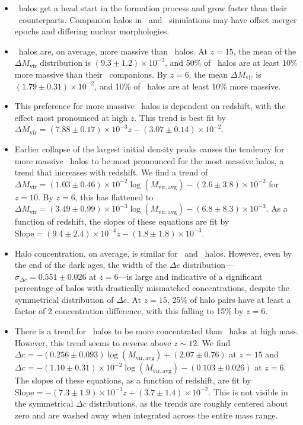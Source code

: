 \begin{itemize}

	\item  \lpt\ halos get a head start in the formation process and grow faster than their \za\ counterparts.  Companion halos in \lpt\ and \za\ simulations may have offset merger epochs and differing nuclear morphologies.

	\item  \lpt\ halos are, on average, more massive than \za\ halos.  At $z = 15$, the mean of the $\Delta M_{\mathrm{vir}}$ distribution is $(9.3 \pm 1.2) \times 10^{-2}$, and 50\% of \lpt\ halos are at least 10\% more massive than their \za\ companions.  By $z = 6$, the mean $\Delta M_{\mathrm{vir}}$ is $(1.79 \pm 0.31) \times 10^{-2}$, and 10\% of \lpt\ halos are at least 10\% more massive.

	\item  This preference for more massive \lpt\ halos is dependent on redshift, with the effect most pronounced at high $z$.  This trend is best fit by $\Delta M_{\mathrm{vir}} = (7.88 \pm 0.17) \times 10^{-3} z - (3.07 \pm 0.14) \times 10^{-2}$.
		
	\item  Earlier collapse of the largest initial density peaks causes the tendency for more massive \lpt\ halos to be most pronounced for the most massive halos, a trend that increases with redshift. We find a trend of $\Delta M_{\mathrm{vir}} = (1.03 \pm 0.46) \times 10^{-2} \log(M_{\mathrm{vir,avg}}) - (2.6 \pm 3.8) \times 10^{-2}$ for $z = 10$.  By $z = 6$, this has flattened to $\Delta M_{\mathrm{vir}} = (3.49 \pm 0.99) \times 10^{-3} \log(M_{\mathrm{vir,avg}}) - (6.8 \pm 8.3) \times 10^{-3}$.  As a function of redshift, the slopes of these equations are fit by $\mathrm{Slope} = (9.4 \pm 2.4) \times 10^{-4} z - (1.8 \pm 1.8) \times 10^{-3}$.

	\item  Halo concentration, on average, is similar for \lpt\ and \za\ halos.  However, even by the end of the dark ages, the width of the $\Delta c$ distribution---$\sigma_{\Delta c} = 0.551 \pm 0.026$ at $z = 6$---is large and indicative of a significant percentage of halos with drastically mismatched concentrations, despite the symmetrical distribution of $\Delta c$.  At $z = 15$, 25\% of halo pairs have at least a factor of 2 concentration difference, with this falling to 15\% by $z = 6$.

	\item  There is a trend for \za\ halos to be more concentrated than \lpt\ halos at high mass.  However, this trend seems to reverse above $z \sim 12$.  We find $\Delta c = -(0.256 \pm 0.093) \log(M_{\mathrm{vir,avg}}) + (2.07 \pm 0.76)$ at $z = 15$ and $\Delta c = -(1.10 \pm 0.31) \times 10^{-2} \log(M_{\mathrm{vir,avg}}) - (0.103 \pm 0.026)$ at $z = 6$.  The slopes of these equations, as a function of redshift, are fit by $\mathrm{Slope} = -(7.3 \pm 1.9) \times 10^{-3} z + (3.7 \pm 1.4) \times 10^{-2}$.  This is not visible in the symmetrical $\Delta c$ distributions, as the trends are roughly centered about zero and are washed away when integrated across the entire mass range.

\end{itemize}

